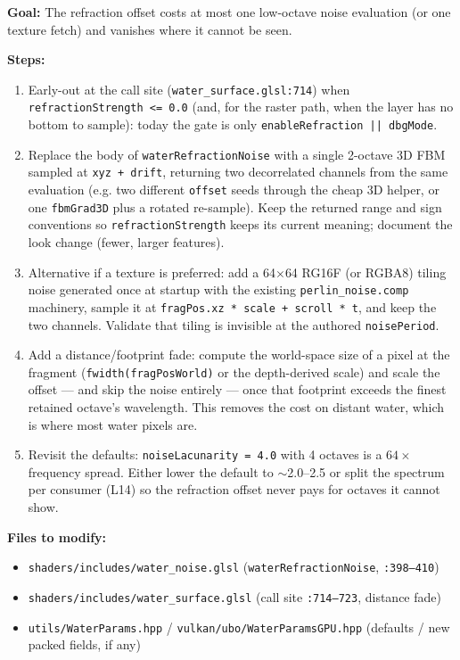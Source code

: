 \documentclass[11pt,a4paper]{article}
\begin{document}
\begin{tcolorbox}[promptbox={Prompt: Make the Refraction Distortion Cheap, Band-Limited and Distance-Aware}]
\textbf{Goal:} The refraction offset costs at most one low-octave noise evaluation (or one texture fetch) and vanishes
where it cannot be seen.

\textbf{Steps:}
\begin{enumerate}
    \item Early-out at the call site (\texttt{water\_surface.glsl:714}) when
    \texttt{refractionStrength <= 0.0} (and, for the raster path, when the layer has no bottom to sample): today the
    gate is only \texttt{enableRefraction || dbgMode}.
    \item Replace the body of \texttt{waterRefractionNoise} with a single 2-octave 3D FBM sampled at
    \texttt{xyz + drift}, returning two decorrelated channels from the same evaluation (e.g. two different
    \texttt{offset} seeds through the cheap 3D helper, or one \texttt{fbmGrad3D} plus a rotated re-sample). Keep the
    returned range and sign conventions so \texttt{refractionStrength} keeps its current meaning; document the look
    change (fewer, larger features).
    \item Alternative if a texture is preferred: add a 64$\times$64 RG16F (or RGBA8) tiling noise generated once at
    startup with the existing \texttt{perlin\_noise.comp} machinery, sample it at
    \texttt{fragPos.xz * scale + scroll * t}, and keep the two channels. Validate that tiling is invisible at the
    authored \texttt{noisePeriod}.
    \item Add a distance/footprint fade: compute the world-space size of a pixel at the fragment
    (\texttt{fwidth(fragPosWorld)} or the depth-derived scale) and scale the offset --- and skip the noise entirely ---
    once that footprint exceeds the finest retained octave's wavelength. This removes the cost on distant water, which
    is where most water pixels are.
    \item Revisit the defaults: \texttt{noiseLacunarity = 4.0} with 4 octaves is a $64\times$ frequency spread. Either
    lower the default to $\sim$2.0--2.5 or split the spectrum per consumer (L14) so the refraction offset never pays for
    octaves it cannot show.
\end{enumerate}

\textbf{Files to modify:}
\begin{itemize}
    \item \texttt{shaders/includes/water\_noise.glsl} (\texttt{waterRefractionNoise}, \texttt{:398--410})
    \item \texttt{shaders/includes/water\_surface.glsl} (call site \texttt{:714--723}, distance fade)
    \item \texttt{utils/WaterParams.hpp} / \texttt{vulkan/ubo/WaterParamsGPU.hpp} (defaults / new packed fields, if any)
\end{itemize}


\end{tcolorbox}
\end{document}
